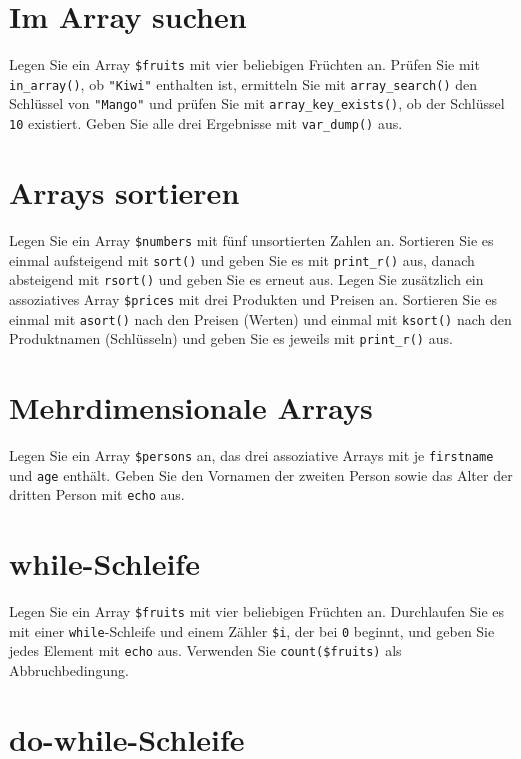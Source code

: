 \documentclass[a4paper,12pt]{article}
\begin{document}
\section{Im Array suchen}

Legen Sie ein Array \texttt{\$fruits} mit vier beliebigen Früchten an. Prüfen Sie mit \texttt{in\_array()}, ob \texttt{"Kiwi"} enthalten ist, ermitteln Sie mit \texttt{array\_search()} den Schlüssel von \texttt{"Mango"} und prüfen Sie mit \texttt{array\_key\_exists()}, ob der Schlüssel \texttt{10} existiert. Geben Sie alle drei Ergebnisse mit \texttt{var\_dump()} aus.

\section{Arrays sortieren}

Legen Sie ein Array \texttt{\$numbers} mit fünf unsortierten Zahlen an. Sortieren Sie es einmal aufsteigend mit \texttt{sort()} und geben Sie es mit \texttt{print\_r()} aus, danach absteigend mit \texttt{rsort()} und geben Sie es erneut aus. Legen Sie zusätzlich ein assoziatives Array \texttt{\$prices} mit drei Produkten und Preisen an. Sortieren Sie es einmal mit \texttt{asort()} nach den Preisen (Werten) und einmal mit \texttt{ksort()} nach den Produktnamen (Schlüsseln) und geben Sie es jeweils mit \texttt{print\_r()} aus.

\section{Mehrdimensionale Arrays}

Legen Sie ein Array \texttt{\$persons} an, das drei assoziative Arrays mit je \texttt{firstname} und \texttt{age} enthält. Geben Sie den Vornamen der zweiten Person sowie das Alter der dritten Person mit \texttt{echo} aus.

\section{while-Schleife}

Legen Sie ein Array \texttt{\$fruits} mit vier beliebigen Früchten an. Durchlaufen Sie es mit einer \texttt{while}-Schleife und einem Zähler \texttt{\$i}, der bei \texttt{0} beginnt, und geben Sie jedes Element mit \texttt{echo} aus. Verwenden Sie \texttt{count(\$fruits)} als Abbruchbedingung.

\section{do-while-Schleife}
\end{document}
